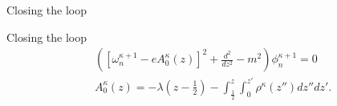 %		    

\begin{frame}{Closing the loop}
		
\end{frame}

\begin{frame}{Closing the loop}
\begin{align*}
			&\left(
				\left[ 
			\omega^{ \kappa+1  }_n 
	-e A_0^{\kappa} (z)  \right]^2 
	+ \frac{d^2}{dz^2} - m^2  \right)
	\phi^{ \kappa + 1  }_n = 0 \\
			       & A_0  ^{\kappa}(z) = -\lambda \left(z-\frac{1}{2}\right) -\int_{\frac{1}{2}}^{z} \int_{0}^{z'} \rho^{\kappa}(z'')dz''   dz'
.
\end{align*}
\end{frame}

